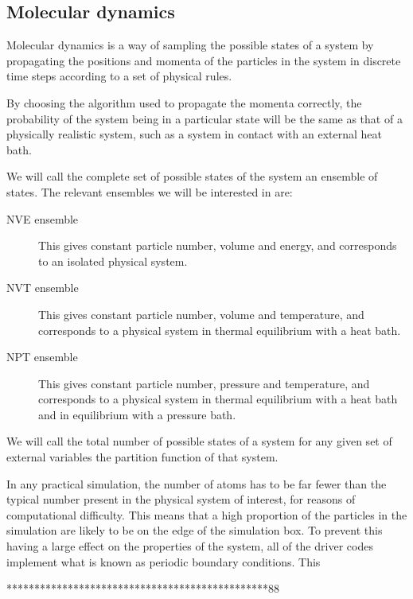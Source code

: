 \documentclass[12pt,fleqn]{report}
\begin{document}
\subsection{Molecular dynamics}
Molecular dynamics is a way of sampling the possible states of a system by 
propagating the positions and momenta of the particles in the system in 
discrete time steps according to a set of physical rules.

By choosing the algorithm used to propagate the momenta correctly, the 
probability of the system being in a particular state will be the same as 
that of a physically realistic system, such as a system in contact with an 
external heat bath.

We will call the complete set of possible states of the system an ensemble of 
states. The relevant ensembles we will be interested in are:
\begin{description}
\item[NVE ensemble] This gives constant particle number, volume and energy, 
and corresponds to an isolated physical system.
\item[NVT ensemble] This gives constant particle number, volume and temperature,
and corresponds to a physical system in thermal equilibrium with a heat bath.
\item[NPT ensemble] This gives constant particle number, pressure and 
temperature, and corresponds to a physical system in thermal equilibrium with 
a heat bath and in equilibrium with a pressure bath.
\end{description}

We will call the total number of possible states of a system for any given set 
of external variables the partition function of that system.

In any practical simulation, the number of atoms has to be far fewer than the 
typical number present in the physical system of interest, for reasons of 
computational difficulty. This means that a high proportion of the particles 
in the simulation are likely to be on the edge of the simulation box. To 
prevent this having a large effect on the properties of the system, all of the 
driver codes implement what is known as periodic boundary conditions. This 

***********************************************88
\end{document}
